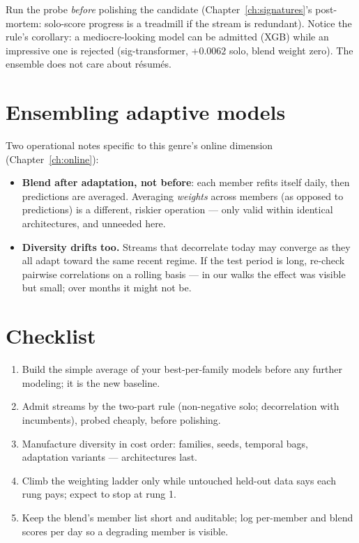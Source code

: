 Run the probe \emph{before} polishing the candidate
(Chapter~\ref{ch:signatures}'s post-mortem: solo-score progress is a
treadmill if the stream is redundant). Notice the rule's corollary: a
mediocre-looking model can be admitted (XGB) while an impressive one is
rejected (sig-transformer, $+0.0062$ solo, blend weight zero). The
ensemble does not care about résumés.

\section{Ensembling adaptive models}

Two operational notes specific to this genre's online dimension
(Chapter~\ref{ch:online}):

\begin{itemize}
\item \textbf{Blend after adaptation, not before}: each member refits
  itself daily, then predictions are averaged. Averaging \emph{weights}
  across members (as opposed to predictions) is a different, riskier
  operation --- only valid within identical architectures, and unneeded
  here.
\item \textbf{Diversity drifts too.} Streams that decorrelate today may
  converge as they all adapt toward the same recent regime. If the test
  period is long, re-check pairwise correlations on a rolling basis ---
  in our walks the effect was visible but small; over months it might
  not be.
\end{itemize}

\section{Checklist}

\begin{enumerate}
\item Build the simple average of your best-per-family models before any
  further modeling; it is the new baseline.
\item Admit streams by the two-part rule (non-negative solo;
  decorrelation with incumbents), probed cheaply, before polishing.
\item Manufacture diversity in cost order: families, seeds, temporal
  bags, adaptation variants --- architectures last.
\item Climb the weighting ladder only while untouched held-out data says
  each rung pays; expect to stop at rung 1.
\item Keep the blend's member list short and auditable; log per-member
  and blend scores per day so a degrading member is visible.
\end{enumerate}
